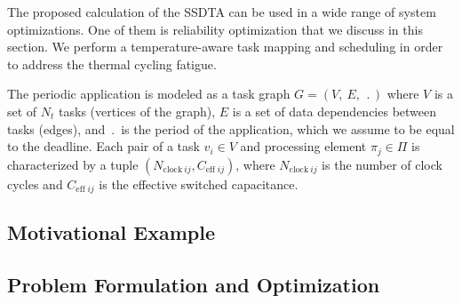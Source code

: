 The proposed calculation of the SSDTA can be used in a wide range of system optimizations. One of them is reliability optimization that we discuss in this section. We perform a temperature-aware task mapping and scheduling in order to address the thermal cycling fatigue.

 \label{sec:application-model}
The periodic application is modeled as a task graph $G = (V, \: E, \: \period)$ where $V$ is a set of $N_t$ tasks (vertices of the graph), $E$ is a set of data dependencies between tasks (edges), and $\period$ is the period of the application, which we assume to be equal to the deadline. Each pair of a task $v_i \in V$ and processing element $\pi_j \in \Pi$ is characterized by a tuple $(N_{\text{clock} \: ij}, C_{\text{eff} \; ij})$, where $N_{\text{clock} \: ij}$ is the number of clock cycles and $C_{\text{eff} \; ij}$ is the effective switched capacitance.

 \label{sec:reliability-model}


\subsection{Motivational Example}


\subsection{Problem Formulation and Optimization} \label{sec:reliability-problem}

